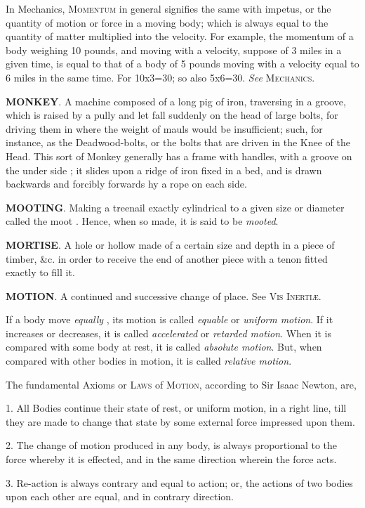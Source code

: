 In Mechanics, \textsc{Momentum} in general signifies the same with impetus, or the quantity of motion or force in a moving body; which is always equal to the quantity of matter multiplied into the velocity. For example, the momentum of a body weighing 10 pounds, and moving with a velocity, suppose of 3 miles in a given time, is equal to that of a body of 5 pounds moving with a velocity equal to 6 miles in the same time. For 10x3=30; so also 5x6=30. \textit{See} \textsc{Mechanics}.

\textbf{MONKEY}. A machine composed of a long pig of iron, traversing in a groove, which is raised by a pully and let fall suddenly on the head of large bolts, for driving them in where the weight of mauls would be insufficient; such, for instance, as the Deadwood-bolts, or the bolts that are driven in the Knee of the Head. This sort of Monkey generally has a frame with handles, with a groove on the under side ; it slides upon a ridge of iron fixed in a bed, and is drawn backwards and forcibly forwards hy a rope on each side. 

\textbf{MOOTING}. Making a treenail exactly cylindrical to a given size or diameter called the moot . Hence, when so made, it is said to be \textit{mooted}. 

\textbf{MORTISE}. A hole or hollow made of a certain size and depth in a piece of timber, \&c. in order to receive the end of another piece with a tenon fitted exactly to fill it. 

\textbf{MOTION}. A continued and successive change of place. See \textsc{Vis Inertiæ}.

If a body move \textit{equally} , its motion is called \textit{equable} or \textit{uniform motion}. If it increases or decreases, it is called \textit{accelerated} or \textit{retarded motion}. When it is compared with some body at rest, it is called \textit{absolute motion}. But, when compared with other bodies in motion, it is called \textit{relative motion}. 

The fundamental Axioms or \textsc{Laws} of \textsc{Motion}, according to Sir Isaac Newton, are, 

1. All Bodies continue their state of rest, or uniform motion, in a right line, till they are made to change that state by some external force impressed upon them. 

2. The change of motion produced in any body, is always proportional to the force whereby it is effected, and in the same direction wherein the force acts. 

3. Re-action is always contrary and equal to action; or, the actions of two bodies upon each other are equal, and in contrary direction. 

